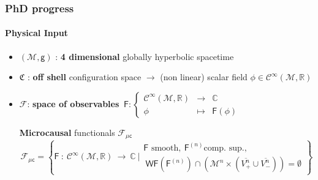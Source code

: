 \documentclass[9pt]{beamer}
\newcommand{\WF}{\mathsf{WF}} %
\newcommand{\supp}{\mathsf{supp}} %
\newcommand{\Ccal}{\mathcal{C}}
\newcommand{\Fcal}{\mathcal{F}}
\newcommand{\Mcal}{\mathcal{M}}
\newcommand{\Cbb}{\mathbb{C}}
\newcommand{\Rbb}{\mathbb{R}}
\newcommand{\Fsf}{\mathsf{F}}
\newcommand{\csf}{\mathsf{c}}
\newcommand{\gsf}{\mathsf{g}}
\begin{document}
\begin{frame}

\frametitle{PhD progress}
\framesubtitle{Physical Input}

\begin{itemize}
  
\item $(\Mcal,\gsf)$ : \textbf{4 dimensional} globally hyperbolic spacetime 
    
\item $\mathfrak{C}$ : \textbf{off shell} configuration space $\to$ (non linear) scalar field $\phi \in \Ccal^\infty(\Mcal,\Rbb)$
        
\item $\Fcal$: \textbf{space of observables}
$
 \ \Fsf : \left\{
 \begin{array}{ccc}
 \Ccal^\infty(\Mcal,\Rbb) & \to & \Cbb \\
 \phi & \mapsto & \Fsf(\phi)
 \end{array}
 \right.
$
   
\vspace*{20pt}
   
   
\textbf{Microcausal} functionals $\Fcal_{\mu\csf}$ \\[-10pt]

\begin{equation*}
\Fcal_{\mu\csf} = 
\left\{ 
\Fsf \ : \ \Ccal^\infty(\Mcal,\Rbb) \ \to \ \Cbb
\ \bigg| 
\begin{array}{l}
 \Fsf \mbox{ smooth}, 
\ \Fsf^{(n)} \mbox{comp. sup.}, \\
\ \WF(\Fsf^{(n)}) \cap \left( \Mcal^n \times ( \overline{V^{n}_{+}} \cup \overline{V^{n}_{-}} ) \right) 
= \emptyset 
\end{array}
\right\} 
\end{equation*}   
   
\end{itemize}
  
\end{frame}  
\end{document}
